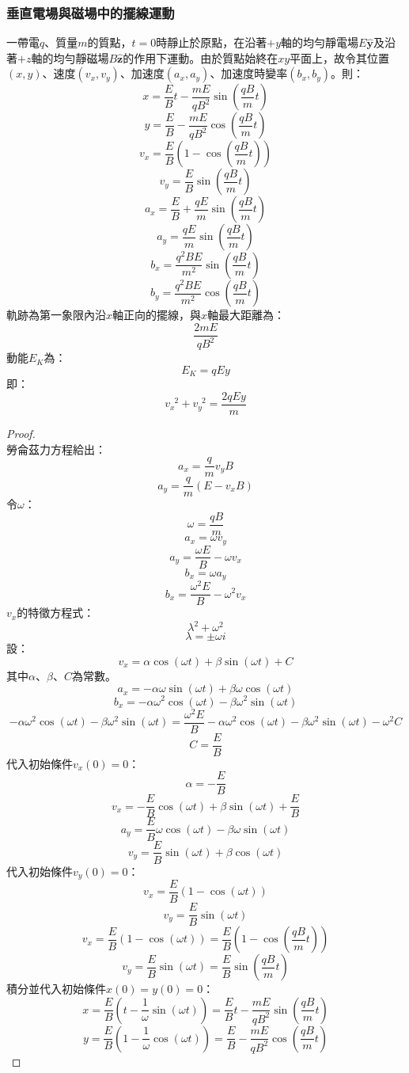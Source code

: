 \documentclass[a4paper,12pt]{report}
\begin{document}
\begin{itemize}
\subsubsection{垂直電場與磁場中的擺線運動}
一帶電$q$、質量$m$的質點，$t=0$時靜止於原點，在沿著$+y$軸的均勻靜電場$E\hat{\mathbf{y}}$及沿著$+z$軸的均勻靜磁場$B\hat{\mathbf{z}}$的作用下運動。由於質點始終在$xy$平面上，故令其位置$(x,y)$、速度$(v_x,v_y)$、加速度$(a_x,a_y)$、加速度時變率$(b_x,b_y)$。則：
\[x=\frac{E}{B}t-\frac{mE}{qB^2}\sin\left(\frac{qB}{m}t\right)\]
\[y=\frac{E}{B}-\frac{mE}{qB^2}\cos\left(\frac{qB}{m}t\right)\]
\[v_x=\frac{E}{B}\left(1-\cos\left(\frac{qB}{m}t\right)\right)\]
\[v_y=\frac{E}{B}\sin\left(\frac{qB}{m}t\right)\]
\[a_x=\frac{E}{B}+\frac{qE}{m}\sin\left(\frac{qB}{m}t\right)\]
\[a_y=\frac{qE}{m}\sin\left(\frac{qB}{m}t\right)\]
\[b_x=\frac{q^2BE}{m^2}\sin\left(\frac{qB}{m}t\right)\]
\[b_y=\frac{q^2BE}{m^2}\cos\left(\frac{qB}{m}t\right)\]
軌跡為第一象限內沿$x$軸正向的擺線，與$x$軸最大距離為：
\[\frac{2mE}{qB^2}\]
動能$E_K$為：
\[E_K=qEy\]
即：
\[v_x^{\phantom{x}2}+v_y^{\phantom{y}2}=\frac{2qEy}{m}\]
\begin{proof}\mbox{}\\
勞侖茲力方程給出：
\[a_x=\frac{q}{m}v_yB\]
\[a_y=\frac{q}{m}(E-v_xB)\]
令$\omega$：
\[\omega=\frac{qB}{m}\]
\[a_x=\omega v_y\]
\[a_y=\frac{\omega E}{B}-\omega v_x\]
\[b_x=\omega a_y\]
\[b_x=\frac{\omega^2E}{B}-\omega^2v_x\]
$v_x$的特徵方程式：
\[\lambda^2+\omega^2\]
\[\lambda=\pm\omega i\]
設：
\[v_x=\alpha\cos(\omega t)+\beta\sin(\omega t)+C\]
其中$\alpha$、$\beta$、$C$為常數。
\[a_x=-\alpha\omega\sin(\omega t)+\beta\omega\cos(\omega t)\]
\[b_x=-\alpha\omega^2\cos(\omega t)-\beta\omega^2\sin(\omega t)\]
\[-\alpha\omega^2\cos(\omega t)-\beta\omega^2\sin(\omega t)=\frac{\omega^2E}{B}-\alpha\omega^2\cos(\omega t)-\beta\omega^2\sin(\omega t)-\omega^2C\]
\[C=\frac{E}{B}\]
代入初始條件$v_x(0)=0$：
\[\alpha=-\frac{E}{B}\]
\[v_x=-\frac{E}{B}\cos(\omega t)+\beta\sin(\omega t)+\frac{E}{B}\]
\[a_y=\frac{E}{B}\omega\cos(\omega t)-\beta\omega\sin(\omega t)\]
\[v_y=\frac{E}{B}\sin(\omega t)+\beta\cos(\omega t)\]
代入初始條件$v_y(0)=0$：
\[v_x=\frac{E}{B}(1-\cos(\omega t))\]
\[v_y=\frac{E}{B}\sin(\omega t)\]
\[v_x=\frac{E}{B}(1-\cos(\omega t))=\frac{E}{B}\left(1-\cos\left(\frac{qB}{m}t\right)\right)\]
\[v_y=\frac{E}{B}\sin(\omega t)=\frac{E}{B}\sin\left(\frac{qB}{m}t\right)\]
積分並代入初始條件$x(0)=y(0)=0$：
\[x=\frac{E}{B}\left(t-\frac{1}{\omega}\sin(\omega t)\right)=\frac{E}{B}t-\frac{mE}{qB^2}\sin\left(\frac{qB}{m}t\right)\]
\[y=\frac{E}{B}\left(1-\frac{1}{\omega}\cos(\omega t)\right)=\frac{E}{B}-\frac{mE}{qB^2}\cos\left(\frac{qB}{m}t\right)\]
\end{proof}

\end{itemize}
\end{document}
